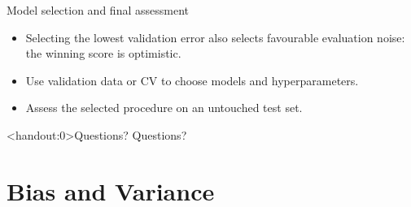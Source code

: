 \documentclass[10pt]{beamer}
\begin{document}
\begin{frame}{Model selection and final assessment}
\begin{itemize}
\item Selecting the lowest validation error also selects favourable evaluation noise: the winning score is optimistic.
\item Use validation data or CV to choose models and hyperparameters.
\item Assess the selected procedure on an untouched test set.
\end{itemize}

\end{frame}

\begin{frame}<handout:0>{Questions?}
Questions?
\end{frame}








\section{Bias and Variance}
\frame{\sectionpage}
\end{document}
